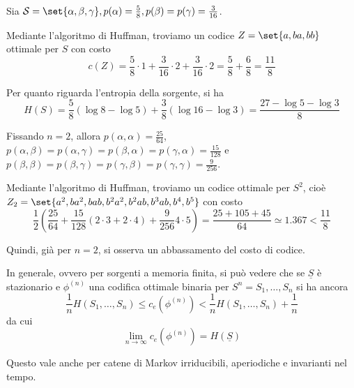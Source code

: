 \begin{example}{}
  Sia \(\SCal = \set{\alpha, \beta, \gamma}, p(\alpha) = \frac{5}{8}, p(\beta) = p(\gamma) = \frac{3}{16}\).

  Mediante l'algoritmo di Huffman, troviamo un codice \(Z=\set{a, ba, bb}\) ottimale per \(S\) con costo
  \[c(Z) = \frac{5}{8} \cdot 1 + \frac{3}{16} \cdot 2 + \frac{3}{16} \cdot 2 = \frac{5}{8} + \frac{6}{8} = \frac{11}{8}\]
  
  Per quanto riguarda l'entropia della sorgente, si ha \[H(S) = \frac{5}{8}(\log 8 - \log 5) + \frac{3}{8}(\log 16 - \log 3) = \frac{27-\log 5 -\log3}{8}\]

  Fissando \(n=2\), allora \(p(\alpha, \alpha) = \frac{25}{64}\), \(p(\alpha, \beta)=p(\alpha, \gamma) = p(\beta, \alpha) = p(\gamma, \alpha) = \frac{15}{128}\) e \(p(\beta, \beta) = p(\beta, \gamma) = p(\gamma, \beta) = p(\gamma, \gamma) = \frac{9}{256}\).
  
  Mediante l'algoritmo di Huffman, troviamo un codice ottimale per \(S^2\), cioè \(Z_2 = \set{a^2, ba^2, bab,b^2a^2, b^2ab,b^3ab,b^4,b^5}\) con costo
  \[\frac{1}{2}\left(\frac{25}{64}+\frac{15}{128}(2\cdot 3 + 2\cdot 4) + \frac{9}{256}4\cdot 5\right) = \frac{25+105+45}{64} \simeq 1.367<\frac{11}{8}\]
  
  Quindi, già per $n=2$, si osserva un abbassamento del costo di codice.
\end{example}

In generale, ovvero per sorgenti a memoria finita, si può vedere che se \(\underline{S}\) è stazionario e \(\phi^{(n)}\) una codifica ottimale binaria per \(S^n=S_1, \ldots, S_n\) si ha ancora
\[\frac{1}{n}H(S_1,\ldots, S_n)\leq c_e(\phi^{(n)}) < \frac{1}{n}H(S_1,\ldots, S_n) + \frac{1}{n}\]
da cui
\[\lim_{n\to \infty} c_e(\phi^{(n)}) = H(\underline{S})\]

Questo vale anche per catene di Markov irriducibili, aperiodiche e invarianti nel tempo.

